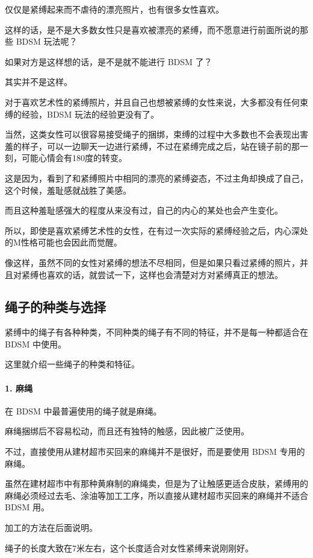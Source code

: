 \documentclass[12pt,UTF8]{ctexbook}
\begin{document}
仅仅是紧缚起来而不虐待的漂亮照片，也有很多女性喜欢。

这样的话，是不是大多数女性只是喜欢被漂亮的紧缚，而不愿意进行前面所说的那些 BDSM 玩法呢？

如果对方是这样想的话，是不是就不能进行 BDSM 了？

其实并不是这样。

对于喜欢艺术性的紧缚照片，并且自己也想被紧缚的女性来说，大多都没有任何束缚的经验，BDSM 玩法的经验更没有了。

当然，这类女性可以很容易接受绳子的捆绑，束缚的过程中大多数也不会表现出害羞的样子，可以一边聊天一边进行紧缚，不过在紧缚完成之后，站在镜子前的那一刻，可能心情会有180度的转变。

这是因为，看到了和紧缚照片中相同的漂亮的紧缚姿态，不过主角却换成了自己，这个时候，羞耻感就战胜了美感。

而且这种羞耻感强大的程度从来没有过，自己的内心的某处也会产生变化。

所以，即使是喜欢紧缚艺术性的女性，在有过一次实际的紧缚经验之后，内心深处的M性格可能也会因此而觉醒。

像这样，虽然不同的女性对紧缚的想法不尽相同，但是如果只看过紧缚的照片，并且对紧缚也喜欢的话，就尝试一下，这样也会清楚对方对紧缚真正的想法。

\subsection{绳子的种类与选择}

紧缚中的绳子有各种种类，不同种类的绳子有不同的特征，并不是每一种都适合在 BDSM 中使用。

这里就介绍一些绳子的种类和特征。

\paragraph{1. 麻绳}

在 BDSM 中最普遍使用的绳子就是麻绳。

麻绳捆绑后不容易松动，而且还有独特的触感，因此被广泛使用。

不过，直接使用从建材超市买回来的麻绳并不是很好，而是要使用 BDSM 专用的麻绳。

虽然在建材超市中有那种黄麻制的麻绳卖，但是为了让触感更适合皮肤，紧缚用的麻绳必须经过去毛、涂油等加工工序，所以直接从建材超市买回来的麻绳并不适合 BDSM 用。

加工的方法在后面说明。

绳子的长度大致在7米左右，这个长度适合对女性紧缚来说刚刚好。
\end{document}
